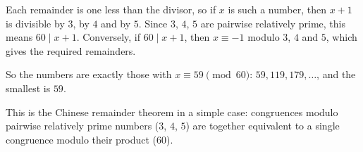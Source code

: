 Each remainder is one less than the divisor, so if $x$ is such a number, then $x+1$ is divisible by $3$, by $4$ and by $5$. Since $3$, $4$, $5$ are pairwise relatively prime, this means $60\mid x+1$. Conversely, if $60\mid x+1$, then $x\equiv-1$ modulo $3$, $4$ and $5$, which gives the required remainders.

So the numbers are exactly those with $x\equiv59\pmod{60}$: $59,119,179,\dots$, and the smallest is $\boxed{59}$.

This is the Chinese remainder theorem in a simple case: congruences modulo pairwise relatively prime numbers ($3$, $4$, $5$) are together equivalent to a single congruence modulo their product ($60$).
